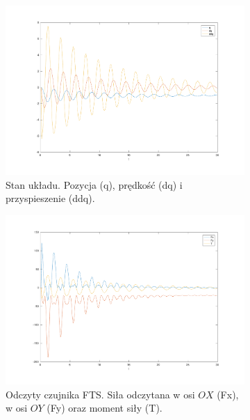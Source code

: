 \documentclass[a4paper, 10pt]{article}
\begin{document}
\begin{figure}
	\centering
	\begin{subfigure}{.5\textwidth}
		\centering
		\includegraphics[width=\linewidth]{test_p}
		\caption{Stan układu. Pozycja (q), prędkość (dq) i przyspieszenie (ddq).}
		\label{fig:system_p}
	\end{subfigure}%
	\begin{subfigure}{.5\textwidth}
		\centering
		\includegraphics[width=\linewidth]{test_s}
		\caption{Odczyty czujnika FTS. Siła odczytana w osi $OX$ (Fx), w osi $OY$ (Fy) oraz moment siły (T).}
		\label{fig:system_s}
	\end{subfigure}
	\begin{subfigure}{.5\textwidth}
		\centering

\end{subfigure}
\end{figure}
\end{document}
